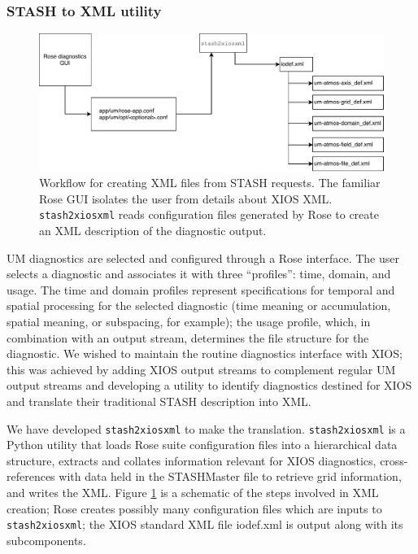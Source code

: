\documentclass[twocolumn, 5p, times]{elsarticle}
\begin{document}
\subsubsection{STASH to XML utility}
\label{stash2xml}
\begin{figure}
	\centerline{
	\includegraphics[scale=0.5]{figures/stash2xiosxml.pdf}}
	\caption {
                Workflow for creating XML files from STASH requests. The familiar Rose GUI isolates the user from details about XIOS XML. \texttt{stash2xiosxml} reads configuration files generated by Rose to create an XML description of the diagnostic output.
		}\label{stash2xiosxml}
\end{figure}
UM diagnostics are selected and configured through a Rose interface. The user selects a diagnostic and associates it with three ``profiles'': time, domain, and usage. The time and domain profiles represent specifications for temporal and spatial processing for the selected diagnostic (time meaning or accumulation, spatial meaning, or subspacing, for example); the usage profile, which, in combination with an output stream, determines the file structure for the diagnostic. We wished to maintain the routine diagnostics interface with XIOS; this was achieved by adding XIOS output streams to complement regular UM output streams and developing a utility to identify diagnostics destined for XIOS and translate their traditional STASH description into XML. 

We have developed \texttt{stash2xiosxml} to make the translation. 
\texttt{stash2xiosxml} is a Python utility that loads Rose suite configuration files into a hierarchical data structure, extracts and collates information relevant for XIOS diagnostics, cross-references with data held in the STASHMaster file to retrieve grid information, and writes the XML. Figure \ref{stash2xiosxml} is a schematic of the steps involved in XML creation; Rose creates possibly many configuration files which are inputs to \texttt{stash2xiosxml}; the XIOS standard XML file iodef.xml is output along with its subcomponents. 
\end{document}

